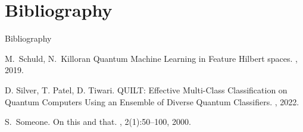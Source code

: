 \documentclass[xcolor=dvipsnames]{beamer}
\begin{document}
\section*{Bibliography}
\begin{frame}{Bibliography}
  \begin{thebibliography}{10}
  
    M.~Schuld, N.~Killoran
    \newblock Quantum Machine Learning in Feature Hilbert spaces.
    , 2019.

    D. Silver, T. Patel, D. Tiwari.
    \newblock QUILT: Effective Multi-Class Classification on Quantum Computers Using an Ensemble of Diverse Quantum Classifiers.
    , 2022.

    S.~Someone.
    \newblock On this and that.
    , 2(1):50--100,
    2000.

  \end{thebibliography}
\end{frame}
\end{document}
